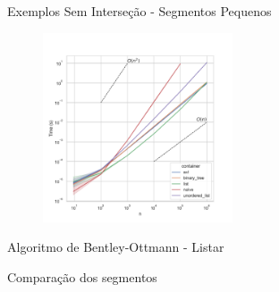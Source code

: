 \documentclass[aspectratio=169,usenames,dvipsnames]{beamer}
\begin{document}
\begin{frame}{Exemplos Sem Interseção - Segmentos Pequenos}
     \begin{figure}
        \includegraphics[width=0.5\textwidth]{figs/tempos/plot_small_detection_time.pdf}
      \end{figure}
\end{frame}


\begin{frame}{Algoritmo de Bentley-Ottmann - Listar}
\end{frame}

\begin{frame}{Comparação dos segmentos}
\end{frame}
\end{document}
